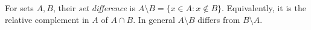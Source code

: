 
For sets $A,B$, their \emph{set difference} is $A\setminus B=\{x\in A:x\notin B\}$. Equivalently, it is the relative complement in $A$ of $A\cap B$. In general $A\setminus B$ differs from $B\setminus A$.
